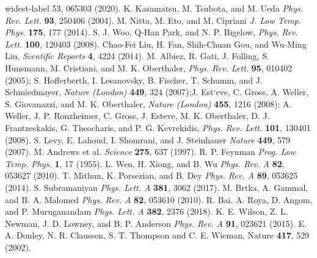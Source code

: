 \documentclass[10pt,a4paper]{article}
\begin{document}
\begin{thebibliography}{widest-label}
{53}, 065303 (2020).
 K. Kasamatsu, M. Tsubota, and M. Ueda {\it Phys. Rev. Lett.} {\bf 93}, 250406 (2004).
 M. Nitta, M. Eto, and M. Cipriani {\it J. Low Temp. Phys.} {\bf 175}, 177 (2014).
 S. J. Woo, Q-Han Park, and N. P. Bigelow, {\it Phys. Rev. Lett.} {\bf 100}, 120403 (2008).
 Chao-Fei Liu, H. Fan, Shih-Chuan Gou, and Wu-Ming Liu, {\it Scentific Reports} {\bf 4}, 4224 (2014).
 M. Albiez, R. Gati, J. Folling, S. Hunsmann, M. Cristiani, and M.
K. Oberthaler, {\it Phys. Rev. Lett.} {\bf 95}, 010402 (2005);  S.
Hofferberth, I. Lesanovsky, B. Fischer, T. Schumm, and J.
Schmiedmayer, {\it Nature (London)} {\bf 449}, 324 (2007);J.
Est`eve, C. Gross, A. Weller, S. Giovanazzi, and M. K. Oberthaler,
{\it Nature (London)} {\bf 455}, 1216 (2008); A. Weller, J. P.
Ronzheimer, C. Gross, J. Esteve, M. K. Oberthaler, D. J.
Frantzeskakis, G. Theocharis, and P. G. Kevrekidis, {\it Phys.
Rev. Lett.} {\bf 101}, 130401 (2008).
  S. Levy, E. Lahoud, I. Shomrani, and J. Steinhauer {\it Nature} {\bf 449}, 579 (2007).
  M. Andrews et al. {\it Science} {\bf 275}, 637 (1997).
  R. P. Feynman {\it Prog. Low Temp. Phys.} {\bf 1}, 17 (1955).
 L. Wen, H. Xiong, and B. Wu {\it Phys. Rev. A} {\bf 82}, 053627 (2010).
 T. Mithun, K. Porsezian, and B. Dey {\it Phys. Rev. A} {\bf 89}, 053625 (2014).
 S. Subramaniyan {\it Phys. Lett. A} {\bf 381}, 3062 (2017).
 M. Brtka, A. Gammal, and B. A. Malomed {\it Phys. Rev. A} {\bf 82}, 053610 (2010).
 R. Bai, A. Roya, D. Angom, and P. Muruganandam {\it Phys. Lett. A} {\bf 382}, 2376 (2018).
 K. E. Wilson, Z. L. Newman, J. D. Lowney, and B. P. Anderson {\it Phys. Rev. A} {\bf 91}, 023621 (2015).
 E. A. Donley, N. R. Claussen, S. T. Thompson and C. E. Wieman, Nature {\bf 417}, 529 (2002).

\end{thebibliography}
\end{document}
